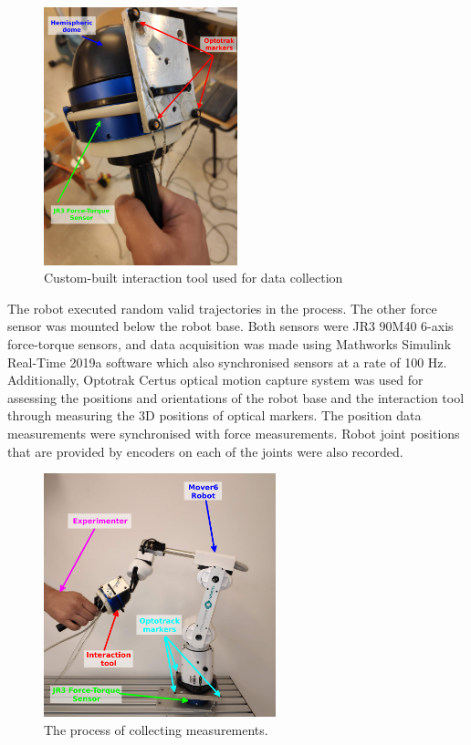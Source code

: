\begin{figure}
    \centering
    \includegraphics[width=0.5\textwidth]{slike/tool}
    \caption{Custom-built interaction tool used for data collection}
    \label{fig:Tool}
\end{figure}

The robot executed random valid trajectories in the process. The other force sensor was mounted below the robot base. Both sensors were JR3 90M40 6-axis force-torque sensors, and data acquisition was made using Mathworks Simulink Real-Time 2019a software which also synchronised sensors at a rate of 100 Hz. Additionally, Optotrak Certus optical motion capture system was used for assessing the positions and orientations of the robot base and the interaction tool through measuring the 3D positions of optical markers. The position data measurements were synchronised with force measurements. Robot joint positions that are provided by encoders on each of the joints were also recorded.

\begin{figure}
    \centering
    \includegraphics[width=0.6\textwidth]{slike/robot}
    \caption{The process of collecting measurements.}
    \label{fig:Robot}
\end{figure}


